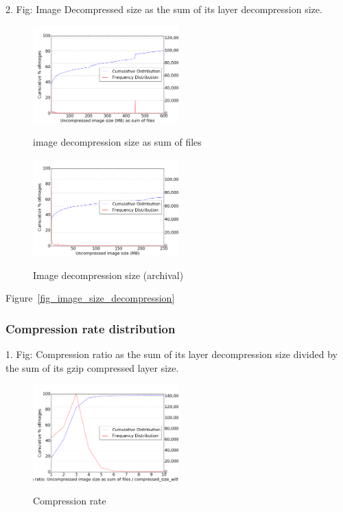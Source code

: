 2. Fig: Image Decompressed size as the sum of its layer decompression size.

\begin{figure}
	\centering
	\includegraphics[width=0.5\textwidth]{graphs/Uncompressed_image_size_(MB)_as_sum_of_files}\\
	\caption{image decompression size as sum of files}\label{fig_image_size_compression}
\end{figure}

\begin{figure}
	\centering
	\includegraphics[width=0.5\textwidth]{graphs/Uncompressed_image_size_(MB)}\\
	\caption{Image decompression size (archival)}\label{fig_image_size_compression}
\end{figure}

Figure~\ref{fig_image_size_decompression}

\subsubsection{Compression rate distribution}

1. Fig: Compression ratio as the sum of its layer decompression size divided by the sum of its gzip compressed layer size.

\begin{figure}
	\centering
	\includegraphics[width=0.5\textwidth]{graphs/Compression_ratio_Uncompressed_image_size_as_sum_of_files_divided_by_compressed_size_with_method_gzip}\\
	\caption{Compression rate}\label{fig_image_size_compression}
\end{figure}

